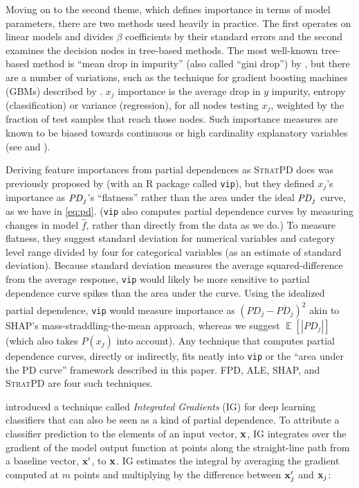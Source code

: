 \documentclass[11pt]{article}
\DeclareMathOperator{\Ex}{\mathbb{E}}
\newcommand{\spd}{\fontfamily{cmr}\textsc{\small StratPD}}
\begin{document}
Moving on to the second theme, which defines importance in terms of model parameters, there are two methods used heavily in practice. The first operates on linear models and divides $\beta$ coefficients by their standard errors and the second examines the decision nodes in tree-based methods. The most well-known tree-based method is ``mean drop in impurity'' (also called ``gini drop'') by \cite{CART}, but there are a number of variations, such as the technique for gradient boosting machines (GBMs) described by \cite{PDP}. $x_j$ importance is the average drop in $y$ impurity, entropy (classification) or variance (regression), for all nodes testing $x_j$, weighted by the fraction of test samples that reach those nodes. Such importance measures are known to be biased towards continuous or high cardinality explanatory variables (see \citealt{permbias} and \citealt{RFunbiased}).

Deriving feature importances from partial dependences as \spd{} does was previously proposed by \cite{pdvim} (with an R package called {\tt vip}), but they defined $x_j$'s importance as ${\it PD}_j$'s ``flatness'' rather than the area under the ideal ${\it PD}_j$ curve, as we have in \eqref{eq:pd}.  ({\tt vip} also computes partial dependence curves by measuring changes in model $\hat{f}$, rather than directly from the data as we do.) To measure flatness, they suggest standard deviation for numerical variables and category level range divided by four for categorical variables (as an estimate of standard deviation).  Because standard deviation measures the average squared-difference from the average response, {\tt vip} would likely be more sensitive to partial dependence curve spikes than the area under the curve.  Using the idealized partial dependence, {\tt vip} would measure importance as $\overline{(PD_j - \overline{PD_j})^2}$ akin to SHAP's mass-straddling-the-mean approach, whereas we suggest $\Ex[|PD_j|]$ (which also takes $P(x_j)$ into account).  Any technique that computes partial dependence curves, directly or indirectly, fits neatly into {\tt vip} or the ``area under the PD curve'' framework described in this paper. FPD, ALE, SHAP, and \spd{} are four such techniques.

\citet{intgrad} introduced a technique called {\em Integrated Gradients} (IG) for deep learning classifiers that can also be seen as a kind of partial dependence. To attribute a classifier prediction to the elements of an input vector, $\bf x$, IG integrates over the gradient of the model output function at points along the straight-line path from a baseline vector, $\bf x'$, to $\bf x$. IG estimates the integral by averaging the gradient computed at $m$ points and multiplying by the difference between ${\bf x}'_j$ and ${\bf x}_j$:
\end{document}
